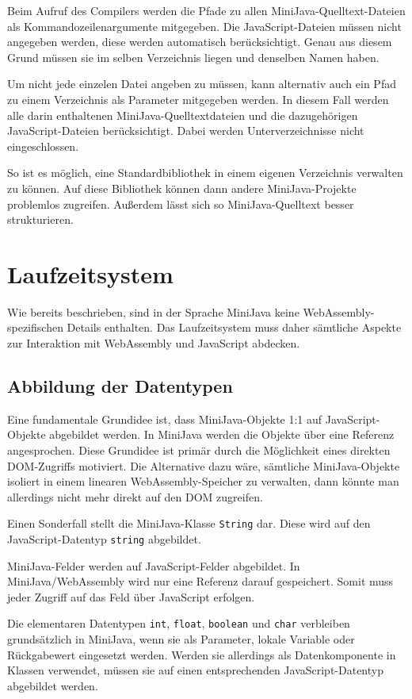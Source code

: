 Beim Aufruf des Compilers werden die Pfade zu allen MiniJava-Quelltext-Dateien als Kommandozeilenargumente mitgegeben. Die JavaScript-Dateien müssen nicht angegeben werden, diese werden automatisch berücksichtigt. Genau aus diesem Grund müssen sie im selben Verzeichnis liegen und denselben Namen haben.

Um nicht jede einzelen Datei angeben zu müssen, kann alternativ auch ein Pfad zu einem Verzeichnis als Parameter mitgegeben werden. In diesem Fall werden alle darin enthaltenen MiniJava-Quelltextdateien und die dazugehörigen JavaScript-Dateien berücksichtigt. Dabei werden Unterverzeichnisse nicht eingeschlossen.

So ist es möglich, eine Standardbibliothek in einem eigenen Verzeichnis verwalten zu können. Auf diese Bibliothek können dann andere MiniJava-Projekte problemlos zugreifen. Außerdem lässt sich so MiniJava-Quelltext besser strukturieren.

\pagebreak
\section{Laufzeitsystem}

Wie bereits beschrieben, sind in der Sprache MiniJava keine WebAssembly-spezifischen Details enthalten. Das Laufzeitsystem muss daher sämtliche Aspekte zur Interaktion mit WebAssembly und JavaScript abdecken.

\subsection{Abbildung der Datentypen}
Eine fundamentale Grundidee ist, dass MiniJava-Objekte 1:1 auf JavaScript-Objekte abgebildet werden. In MiniJava werden die Objekte über eine Referenz angesprochen. Diese Grundidee ist primär durch die Möglichkeit eines direkten DOM-Zugriffs motiviert. Die Alternative dazu wäre, sämtliche MiniJava-Objekte isoliert in einem linearen WebAssembly-Speicher zu verwalten, dann könnte man allerdings nicht mehr direkt auf den DOM zugreifen.

Einen Sonderfall stellt die MiniJava-Klasse \lstinline{String} dar. Diese wird auf den JavaScript-Datentyp \lstinline{string} abgebildet.

MiniJava-Felder werden auf JavaScript-Felder abgebildet. In MiniJava/WebAssembly wird nur eine Referenz darauf gespeichert. Somit muss jeder Zugriff auf das Feld über JavaScript erfolgen.

Die elementaren Datentypen \lstinline{int}, \lstinline{float}, \lstinline{boolean} und \lstinline{char} verbleiben grundsätzlich in MiniJava, wenn sie als Parameter, lokale Variable oder Rückgabewert eingesetzt werden. Werden sie allerdings als Datenkomponente in Klassen verwendet, müssen sie auf einen entsprechenden JavaScript-Datentyp abgebildet werden.

